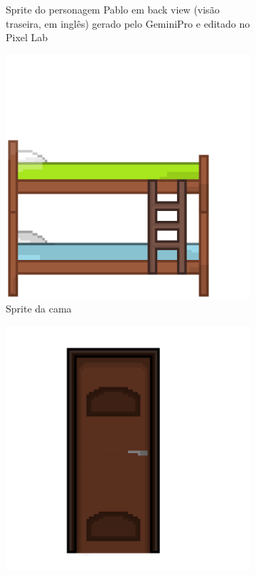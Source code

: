 \begin{figure}[htbp]
\begin{subfigure}{0.22\linewidth}
        \caption{\small Sprite do personagem Pablo em back view (visão traseira, em inglês) gerado pelo GeminiPro e editado no Pixel Lab}
        \label{fig:viduPabloGeminiProBack}
    \end{subfigure}
    \begin{subfigure}{0.32\linewidth}
        \centering
        \includegraphics[width=1\linewidth]{figs/vidu/referencia_cama.png}
        \caption{\small Sprite da cama}
        \label{fig:viduCama}
    \end{subfigure}
    \begin{subfigure}{0.18\linewidth}
        \centering
        \includegraphics[width=1\linewidth]{figs/vidu/referencia_porta (1).png}

\end{subfigure}
\end{figure}
